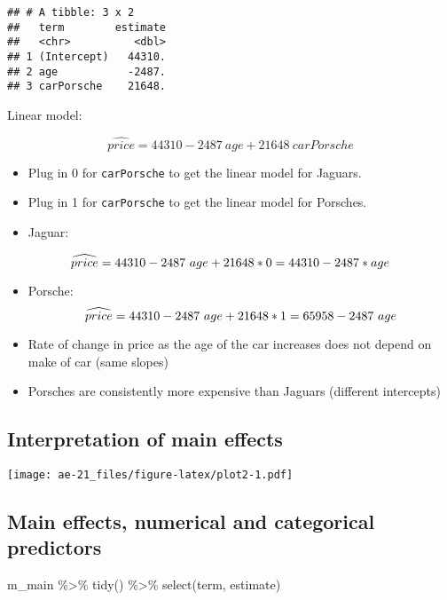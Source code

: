 \documentclass[
]{article}
\newenvironment{Shaded}{\begin{snugshade}}{\end{snugshade}}
\newcommand{\FunctionTok}[1]{\textcolor[rgb]{0.00,0.00,0.00}{#1}}
\newcommand{\NormalTok}[1]{#1}
\newcommand{\SpecialCharTok}[1]{\textcolor[rgb]{0.00,0.00,0.00}{#1}}
\begin{document}
\begin{verbatim}
## # A tibble: 3 x 2
##   term        estimate
##   <chr>          <dbl>
## 1 (Intercept)   44310.
## 2 age           -2487.
## 3 carPorsche    21648.
\end{verbatim}

Linear model:

\[ \widehat{price} = 44310 - 2487~age + 21648~carPorsche \]

\begin{itemize}
\item
  Plug in 0 for \texttt{carPorsche} to get the linear model for Jaguars.
\item
  Plug in 1 for \texttt{carPorsche} to get the linear model for
  Porsches.
\item
  Jaguar:
\end{itemize}

\[ \widehat{price} = 44310 - 2487~age + 21648* 0 \\
=44310-2487*age\]

\begin{itemize}
\item
  Porsche: \[ \widehat{price} = 44310 - 2487~age + 21648* 1 \\
  =65958 - 2487~age\]
\item
  Rate of change in price as the age of the car increases does not
  depend on make of car (same slopes)
\item
  Porsches are consistently more expensive than Jaguars (different
  intercepts)
\end{itemize}

\hypertarget{interpretation-of-main-effects}{%
\subsection{Interpretation of main
effects}\label{interpretation-of-main-effects}}

\texttt{[image: ae-21\_files/figure-latex/plot2-1.pdf]}

\hypertarget{main-effects-numerical-and-categorical-predictors}{%
\subsection{Main effects, numerical and categorical
predictors}\label{main-effects-numerical-and-categorical-predictors}}

\begin{Shaded}
\begin{Highlighting}[]
\NormalTok{m\_main }\SpecialCharTok{\%\textgreater{}\%}
  \FunctionTok{tidy}\NormalTok{() }\SpecialCharTok{\%\textgreater{}\%}
  \FunctionTok{select}\NormalTok{(term, estimate)}
\end{Highlighting}
\end{Shaded}
\end{document}
